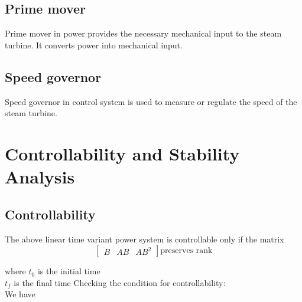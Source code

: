 \documentclass[journal]{IEEEtran}
\begin{document}
\subsection{Prime mover}
Prime mover in power provides the necessary mechanical input to the steam turbine. It converts power into mechanical input.
\subsection{Speed governor}
Speed governor in control system is used to measure or regulate the speed of the steam turbine.
\section{Controllability and Stability Analysis}
\subsection{Controllability} The above linear time variant power system is controllable only if the matrix \\
\begin{equation}
\begin{bmatrix}
B & AB & AB^2 
\end{bmatrix}
\text{preserves rank}
\end{equation}

where $t_{0}$ is the initial time \\
$t_{f}$ is the final time
Checking the condition for controllability: \\
We have \\
\end{document}
